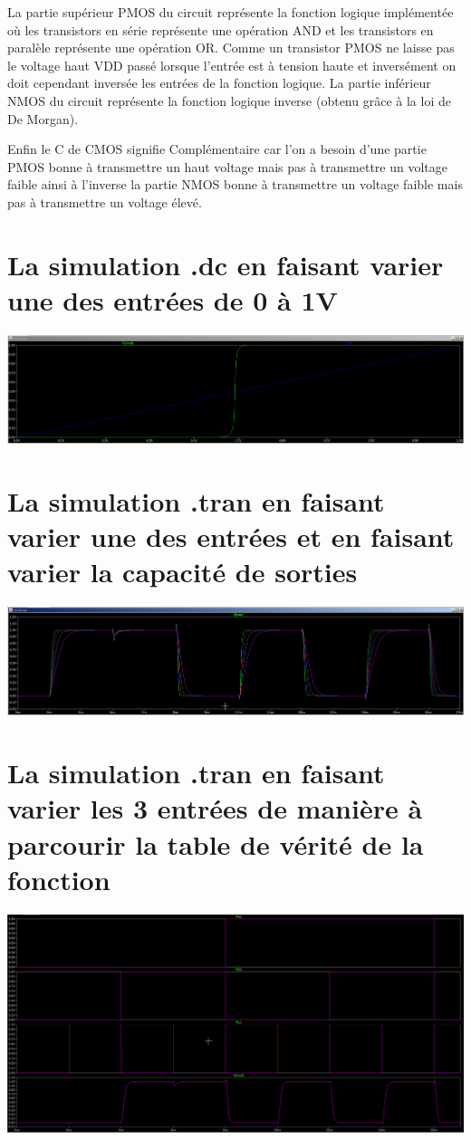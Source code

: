 \documentclass{homeworg}
\begin{document}
     La partie supérieur PMOS du circuit représente la fonction logique implémentée où les transistors en série représente une opération AND et les transistors en paralèle représente une opération OR. Comme un transistor PMOS ne laisse pas le voltage haut VDD passé lorsque l'entrée est à tension haute et inversément on doit cependant inversée les entrées de la fonction logique. La partie inférieur NMOS du circuit représente la fonction logique inverse (obtenu grâce à la loi de De Morgan).
     
     Enfin le C de CMOS signifie Complémentaire car l'on a besoin d'une partie PMOS bonne à transmettre un haut voltage mais pas à transmettre un voltage faible ainsi à l'inverse la partie NMOS bonne à transmettre un voltage faible mais pas à transmettre un voltage élevé.\\[1cm]

\section{La simulation .dc en faisant varier une des entrées de 0 à 1V}
    \includegraphics[scale=0.3]{dc.png}\\[1cm]

\section{La simulation .tran en faisant varier une des entrées et en faisant varier la capacité de sorties}
    \includegraphics[scale=0.3]{capa.png}
\section{La simulation .tran en faisant varier les 3 entrées de manière à parcourir la table de vérité de la fonction}
    \begin{center}
        \includegraphics[scale=0.3]{plot.png}
    \end{center}
\end{document}
